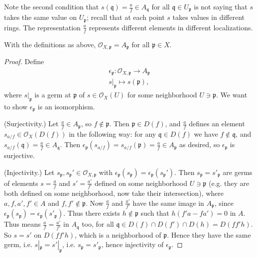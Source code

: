 \documentclass[12pt]{article}
\begin{document}
\begin{remark}
	Note the second condition that $s(\mathfrak{q})=\frac{a}{f}\in A_\mathfrak{q}$ for all $\mathfrak{q}\in U_\mathfrak{p}$ is not saying that $s$ takes the same value on $U_\mathfrak{p}$; recall that at each point $s$ takes values in different rings. The representation $\frac{a}{f}$ represents different elements in different localizations.
\end{remark}

\begin{proposition}
	With the definitions as above, $\mathcal{O}_{X,\mathfrak{p}}=A_\mathfrak{p}$ for all $\mathfrak{p}\in X$.
\end{proposition}
\begin{proof}
	Define 
	\begin{gather*}
		\epsilon_\mathfrak{p}:\mathcal{O}_{X,\mathfrak{p}}\to A_\mathfrak{p} \\
		s|_\mathfrak{p}\mapsto s(\mathfrak{p}),
	\end{gather*}
	where $s|_\mathfrak{p}$ is a germ at $\mathfrak{p}$ of $s\in\mathcal{O}_X(U)$ for some neighborhood $U\ni\mathfrak{p}$. We want to show $\epsilon_\mathfrak{p}$ is an isomorphism.

	(Surjectivity.) Let $\frac{a}{f}\in A_\mathfrak{p}$, so $f\not\in\mathfrak{p}$. Then $\mathfrak{p}\in D(f)$, and $\frac{a}{f}$ defines an element $s_{a/f}\in\mathcal{O}_X(D(f))$ in the following way: for any $\mathfrak{q}\in D(f)$ we have $f\not\in \mathfrak{q}$, and $s_{a/f}(\mathfrak{q})=\frac{a}{f}\in A_\mathfrak{q}$. Then $\epsilon_\mathfrak{p}(s_{a/f})=s_{a/f}(\mathfrak{p})=\frac{a}{f}\in A_\mathfrak{p}$ as desired, so $\epsilon_\mathfrak{p}$ is surjective.

	(Injectivity.) Let $s_\mathfrak{p},s_{\mathfrak{p}}'\in\mathcal{O}_{X,\mathfrak{p}}$ with $\epsilon_\mathfrak{p}(s_\mathfrak{p})=\epsilon_\mathfrak{p}(s_\mathfrak{p}')$. Then $s_\mathfrak{p}=s'_{\mathfrak{p}}$ are germs of elements $s=\frac{a}{f}$ and $s'=\frac{a'}{f'}$ defined on some neighborhood $U\ni\mathfrak{p}$ (e.g. they are both defined on some neighborhood, now take their intersection), where $a,f,a',f'\in A$ and $f,f'\not\in\mathfrak{p}$. Now $\frac{a}{f}$ and $\frac{a'}{f'}$ have the same image in $A_\mathfrak{p}$, since $\epsilon_\mathfrak{p}(s_\mathfrak{p})=\epsilon_\mathfrak{p}(s'_\mathfrak{p})$. Thus there exists $h\not\in\mathfrak{p}$ such that $h(f'a-fa')=0$ in $A$. Thus means $\frac{a}{f}=\frac{a'}{f'}$ in $A_\mathfrak{q}$ too, for all $\mathfrak{q}\in D(f)\cap D(f')\cap D(h)=D(ff'h)$. So $s=s'$ on $D(ff'h)$, which is a neighborhood of $\mathfrak{p}$. Hence they have the same germ, i.e. $s|_\mathfrak{p}=s'|_{\mathfrak{p}}$, i.e. $s_\mathfrak{p}=s'_\mathfrak{p}$, hence injectivity of $\epsilon_\mathfrak{p}$.
\end{proof}
\end{document}
